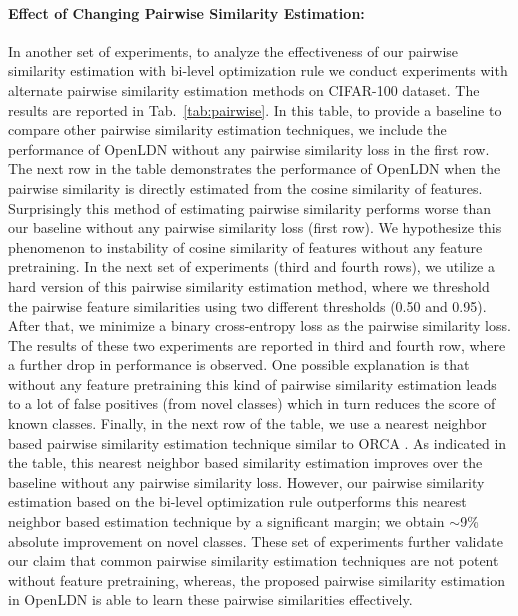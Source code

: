 \documentclass[runningheads]{eccv2022submission}
\begin{document}
\paragraph{\textbf{Effect of Changing Pairwise Similarity Estimation:}}
\label{par:alt_loss}
In another set of experiments, to analyze the effectiveness of our pairwise similarity estimation with bi-level optimization rule we conduct experiments with alternate pairwise similarity estimation methods on CIFAR-100 dataset. The results are reported in Tab.~\ref{tab:pairwise}. In this table, to provide a baseline to compare other pairwise similarity estimation techniques, we include the performance of OpenLDN without any pairwise similarity loss in the first row. The next row in the table demonstrates the performance of OpenLDN when the pairwise similarity is directly estimated from the cosine similarity of features. Surprisingly this method of estimating pairwise similarity performs worse than our baseline without any pairwise similarity loss (first row). We hypothesize this phenomenon to instability of cosine similarity of features without any feature pretraining. In the next set of experiments (third and fourth rows), we utilize a hard version of this pairwise similarity estimation method, where we threshold the pairwise feature similarities using two different thresholds (0.50 and 0.95). After that, we minimize a binary cross-entropy loss as the pairwise similarity loss. The results of these two experiments are reported in third and fourth row, where a further drop in performance is observed. One possible explanation is that without any feature pretraining this kind of pairwise similarity estimation leads to a lot of false positives (from novel classes) which in turn reduces the score of known classes. Finally, in the next row of the table, we use a nearest neighbor based pairwise similarity estimation technique similar to ORCA \cite{cao2022openworld}. As indicated in the table, this nearest neighbor based similarity estimation improves over the baseline without any pairwise similarity loss. However, our pairwise similarity estimation based on the bi-level optimization rule outperforms this nearest neighbor based estimation technique by a significant margin; we obtain $\sim$9\% absolute improvement on novel classes. These set of experiments further validate our claim that common pairwise similarity estimation techniques are not potent without feature pretraining, whereas, the proposed pairwise similarity estimation in OpenLDN is able to learn these pairwise similarities effectively.
\end{document}
